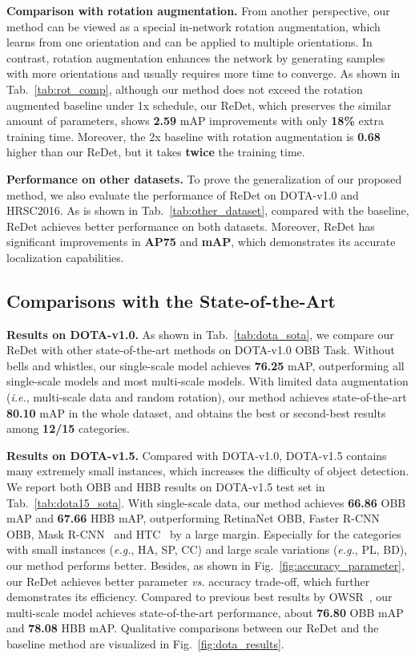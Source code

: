\documentclass[final]{cvpr}
\begin{document}
{{\bf Comparison with rotation augmentation.} From another perspective, our method can be viewed as a special in-network rotation augmentation, which learns from one orientation and can be applied to multiple orientations. In contrast, rotation augmentation enhances the network by generating samples with more orientations and usually requires more time to converge.
As shown in Tab.~\ref{tab:rot_comp}, although our method does not exceed the rotation augmented baseline under 1x schedule,
our ReDet, which preserves the similar amount of parameters, shows \textbf{2.59} mAP improvements with only \textbf{18\%} extra training time.
Moreover, the 2x baseline with rotation augmentation is \textbf{0.68} higher than our ReDet, but it takes \textbf{twice} the training time.

{\bf Performance on other datasets.} To prove the generalization of our proposed method, we also evaluate the performance of ReDet on DOTA-v1.0 and HRSC2016.
As is shown in Tab.~\ref{tab:other_dataset}, compared with the baseline, ReDet achieves better performance on both datasets.
Moreover, ReDet has significant improvements in \textbf{AP75} and \textbf{mAP}, which demonstrates its accurate localization capabilities.


\subsection{Comparisons with the State-of-the-Art}
{\bf Results on DOTA-v1.0.} As shown in Tab.~\ref{tab:dota_sota}, we compare our ReDet with other state-of-the-art methods on DOTA-v1.0 OBB Task. Without bells and whistles, our single-scale model achieves \textbf{76.25} mAP, outperforming all single-scale models and most multi-scale models.
With limited data augmentation (\emph{i.e.}, multi-scale data and random rotation), our method achieves state-of-the-art \textbf{80.10} mAP in the whole dataset, and obtains the best or second-best results among \textbf{12/15} categories.

{\bf Results on DOTA-v1.5.} Compared with DOTA-v1.0, DOTA-v1.5 contains many extremely small instances, which increases the difficulty of object detection. We report both OBB and HBB results on DOTA-v1.5 test set in Tab.~\ref{tab:dota15_sota}. With single-scale data, our method achieves \textbf{66.86} OBB mAP and \textbf{67.66} HBB mAP, outperforming RetinaNet OBB, Faster R-CNN OBB, Mask R-CNN~\cite{he2017maskrcnn} and HTC~\cite{chen2019hybrid} by a large margin.
Especially for the categories with small instances (\emph{e.g.}, HA, SP, CC) and large scale variations (\emph{e.g.}, PL, BD), our method performs better.
Besides, as shown in Fig.~\ref{fig:accuracy_parameter}, our ReDet achieves better parameter \emph{vs.} accuracy trade-off, which further demonstrates its efficiency.
Compared to previous best results by OWSR~\cite{li2019oswr}, our multi-scale model achieves state-of-the-art performance, about \textbf{76.80} OBB mAP and \textbf{78.08} HBB mAP. 
Qualitative comparisons between our ReDet and the baseline method are visualized in Fig.~\ref{fig:dota_results}.

}
\end{document}
